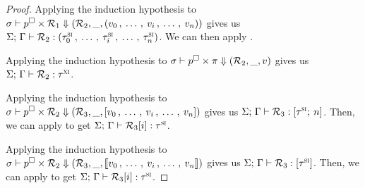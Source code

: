 \begin{proof}
  Applying the induction hypothesis to
  $ \sigma \vdash p^\square \times \mathcal{R}_1 \Downarrow (\mathcal{R}_2, \_, 
    (v_0 \, , \: \ldots \, , \: v_i \, , \: \ldots \, , \: v_n)
  ) $ gives us $\Sigma; \, \Gamma \vdash \mathcal{R}_2 : 
    (\tau^\textsc{si}_0 \, , \: \ldots \, , \: \tau^\textsc{si}_i \, , \: \ldots \, , \: \tau^\textsc{si}_n)
  $. We can then apply .
  
  \vspace{1em}
  \noindent \framebox[\textwidth]{
    \figuresize
    \begin{mathpar}
      \PDerefPtr
    \end{mathpar}
  }
  \vspace{1em}

  Applying the induction hypothesis to 
  $ \sigma \vdash p^\square \times \pi \Downarrow (\mathcal{R}_2, \_, v) $
  gives us $\Sigma; \, \Gamma \vdash \mathcal{R}_2 : 
    \tau^\textsc{xi}
  $.

  \vspace{1em}
  \noindent \framebox[\textwidth]{
    \figuresize
    \begin{mathpar}
      \PDerefIndexPtrArray \and \WFRefIndexArray
    \end{mathpar}
  }
  \vspace{1em}

  Applying the induction hypothesis to
  $ \sigma \vdash p^\square \times \mathcal{R}_2 \Downarrow (\mathcal{R}_3, \_, 
    [v_0 \, , \: \ldots \, , \: v_i \, , \: \ldots \, , \: v_n]
  ) $ gives us $\Sigma; \, \Gamma \vdash \mathcal{R}_3 : 
    [\tau^\textsc{si} ; \: n]
  $. Then, we can apply  to get
  $\Sigma; \, \Gamma \vdash \mathcal{R}_3 [ i ] : 
    \tau^\textsc{si}
  $.

  \vspace{1em}
  \noindent \framebox[\textwidth]{
    \figuresize
    \begin{mathpar}
      \PDerefIndexPtrSlice \and \WFRefIndexSlice
    \end{mathpar}
  }
  \vspace{1em}

  Applying the induction hypothesis to
  $ \sigma \vdash p^\square \times \mathcal{R}_2 \Downarrow (\mathcal{R}_3, \_, 
    \llbracket v_0 \, , \: \ldots \, , \: v_i \, , \: \ldots \, , \: v_n \rrbracket
  ) $ gives us $\Sigma; \, \Gamma \vdash \mathcal{R}_3 : 
    [\tau^\textsc{si}]
  $. Then, we can apply  to get
  $\Sigma; \, \Gamma \vdash \mathcal{R}_3 [ i ] : 
    \tau^\textsc{si}
  $.


\end{proof}
